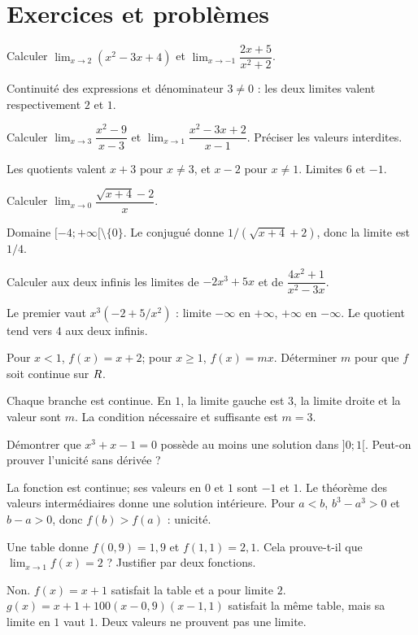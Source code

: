 \section{Exercices et problèmes}
\label{t11s-c02-e01}
Calculer $\lim_{x\to2}(x^2-3x+4)$ et $\lim_{x\to-1}\dfrac{2x+5}{x^2+2}$.
\begin{corrige}\label{sol-t11s-c02-e01}
Continuité des expressions et dénominateur $3\ne0$ : les deux limites valent respectivement $2$ et $1$.
\end{corrige}
\exo[Factoriser]\label{t11s-c02-e02}
Calculer $\lim_{x\to3}\dfrac{x^2-9}{x-3}$ et $\lim_{x\to1}\dfrac{x^2-3x+2}{x-1}$. Préciser les valeurs interdites.
\begin{corrige}\label{sol-t11s-c02-e02}
Les quotients valent $x+3$ pour $x\ne3$, et $x-2$ pour $x\ne1$. Limites $6$ et $-1$.
\end{corrige}
\exo[Racines]\label{t11s-c02-e03}
Calculer $\lim_{x\to0}\dfrac{\sqrt{x+4}-2}{x}$.
\begin{corrige}\label{sol-t11s-c02-e03}
Domaine $[-4;+\infty[\setminus\{0\}$. Le conjugué donne $1/(\sqrt{x+4}+2)$, donc la limite est $1/4$.
\end{corrige}
\label{t11s-c02-e04}
Calculer aux deux infinis les limites de $-2x^3+5x$ et de $\dfrac{4x^2+1}{x^2-3x}$.
\begin{corrige}\label{sol-t11s-c02-e04}
Le premier vaut $x^3(-2+5/x^2)$ : limite $-\infty$ en $+\infty$, $+\infty$ en $-\infty$. Le quotient tend vers $4$ aux deux infinis.
\end{corrige}
\exo[Raccorder]\label{t11s-c02-e05}
Pour $x<1$, $f(x)=x+2$; pour $x\ge1$, $f(x)=mx$. Déterminer $m$ pour que $f$ soit continue sur $R$.
\begin{corrige}\label{sol-t11s-c02-e05}
Chaque branche est continue. En $1$, la limite gauche est $3$, la limite droite et la valeur sont $m$. La condition nécessaire et suffisante est $m=3$.
\end{corrige}
\exo[Un zéro]\label{t11s-c02-e06}
Démontrer que $x^3+x-1=0$ possède au moins une solution dans $]0;1[$. Peut-on prouver l’unicité sans dérivée ?
\begin{corrige}\label{sol-t11s-c02-e06}
La fonction est continue; ses valeurs en $0$ et $1$ sont $-1$ et $1$. Le théorème des valeurs intermédiaires donne une solution intérieure. Pour $a<b$, $b^3-a^3>0$ et $b-a>0$, donc $f(b)>f(a)$ : unicité.
\end{corrige}
\label{t11s-c02-e07}
Une table donne $f(0{,}9)=1{,}9$ et $f(1{,}1)=2{,}1$. Cela prouve-t-il que $\lim_{x\to1}f(x)=2$ ? Justifier par deux fonctions.
\begin{corrige}\label{sol-t11s-c02-e07}
Non. $f(x)=x+1$ satisfait la table et a pour limite $2$. $g(x)=x+1+100(x-0{,}9)(x-1{,}1)$ satisfait la même table, mais sa limite en $1$ vaut $1$. Deux valeurs ne prouvent pas une limite.
\end{corrige}

